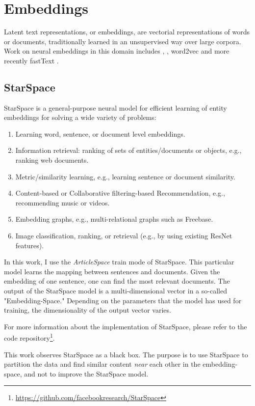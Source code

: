 \section{Embeddings}
\label{Embeddigns}
Latent text representations, or embeddings, are vectorial representations of words or documents, traditionally learned in an unsupervised way over large corpora. Work on neural embeddings in this domain includes \cite{Bengio2003}, 
\cite{Collobert2011}, word2vec \cite{goldberg2014word2vec} and more recently fastText \cite{joulin2016fasttext}.

\subsection{StarSpace}
\label{subsec:StarSpace}
StarSpace \cite{StarSpace} is a general-purpose neural model for efficient learning of entity embeddings for solving a wide variety of problems:

\begin{enumerate}
    \item Learning word, sentence, or document level embeddings.
    \item Information retrieval: ranking of sets of entities/documents or objects, e.g., ranking web documents.
    \item Metric/similarity learning, e.g., learning sentence or document similarity.
    \item Content-based or Collaborative filtering-based Recommendation, e.g., recommending music or videos.
    \item Embedding graphs, e.g., multi-relational graphs such as Freebase.
    \item Image classification, ranking, or retrieval (e.g., by using existing ResNet features).
\end{enumerate}

In this work, I use the \emph{ArticleSpace} train mode of StarSpace. This particular model learns the mapping between sentences and documents. Given the embedding of one sentence, one can find the most relevant documents. The output of the StarSpace model is a multi-dimensional vector in a so-called "Embedding-Space." Depending on the parameters that the model has used for training, the dimensionality of the output vector varies. 

For more information about the implementation of StarSpace, please refer to the code repository\footnote{\url{https://github.com/facebookresearch/StarSpace}}.


This work observes StarSpace as a black box. The purpose is to use StarSpace to partition the data and find similar content \emph{near} each other in the embedding-space, and not to improve the StarSpace model.

